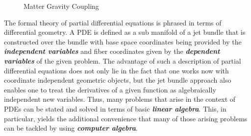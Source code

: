\begin{figure}[hbt!]
\centering 
{}
\caption{Matter Gravity Coupling}\label{MatterGrav}
\end{figure}

The formal theory of partial differential equations is phrased in terms of differential geometry. A PDE is defined as a sub manifold of a jet bundle that is constructed over the bundle with base space coordinates being provided by the \textit{\textbf{independent variables}} and fiber coordinates given by the \textit{\textbf{dependent variables}} of the given problem. The advantage of such a description of partial differential equations does not only lie in the fact that one works now with coordinate independent geometric objects, but the jet bundle approach also enables one to treat the derivatives of a given function as algebraically independent new variables. Thus, many problems that arise in the context of PDEs can be stated and solved in terms of basic \textit{\textbf{linear algebra}}. This, in particular, yields the additional convenience that many of those arising problems can be tackled by using \textbf{\textit{computer algebra}}.

